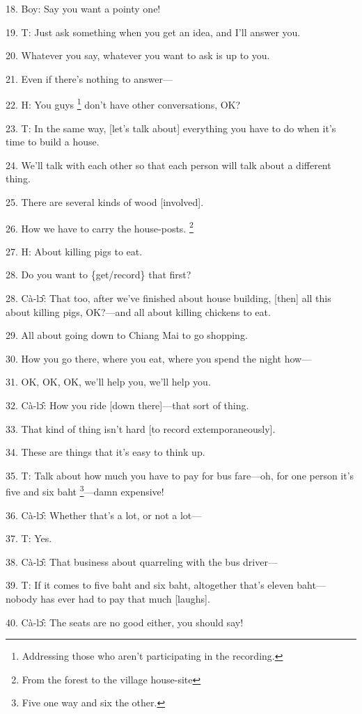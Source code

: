 18. Boy: Say you want a pointy one!

19. T: Just ask something when you get an idea, and I'll answer you.

20. Whatever you say, whatever you want to ask is up to you.

21. Even if there's nothing to answer---

22. H: You guys \footnote{Addressing those who aren't participating in the recording.} don't have other conversations, OK?

23. T: In the same way, [let's talk about] everything you have to do when it's
time to build a house.

24. We'll talk with each other so that each person will talk about a different
thing.

25. There are several kinds of wood [involved].

26. How we have to carry the house-posts. \footnote{From the forest to the village house-site}

27. H: About killing pigs to eat.

28. Do you want to \{get/record\} that first?

28. Cà-lɔ̂: That too, after we've finished about house building, [then] all
this about killing pigs, OK?---and all about killing chickens to eat.

29. All about going down to Chiang Mai to go shopping.

30. How you go there, where you eat, where you spend the night how---

31. OK, OK, OK, we'll help you, we'll help you.

32. Cà-lɔ̂: How you ride [down there]---that sort of thing.

33. That kind of thing isn't hard [to record extemporaneously].

34. These are things that it's easy to think up.

35. T: Talk about how much you have to pay for bus fare---oh, for one person it's
five and six baht \footnote{Five one way and six the other.}---damn expensive!

36. Cà-lɔ̂: Whether that's a lot, or not a lot---

37. T: Yes.

38. Cà-lɔ̂: That business about quarreling with the bus driver---

39. T: If it comes to five baht and six baht, altogether that's eleven baht---nobody
has ever had to pay that much [laughs].

40. Cà-lɔ̂: The seats are no good either, you should say!

